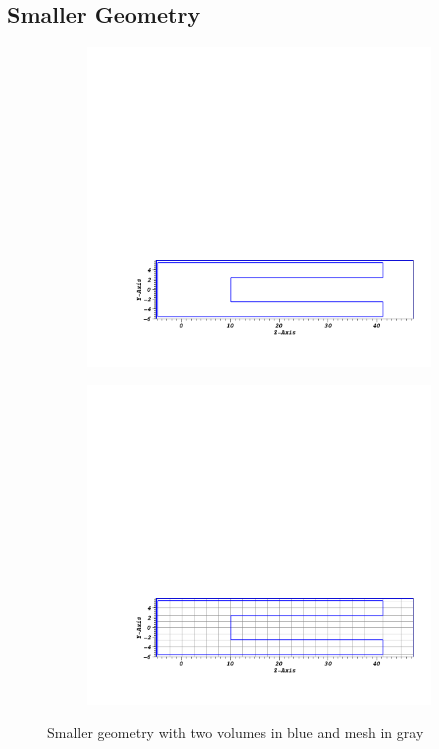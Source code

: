 \subsection{Smaller Geometry}

\begin{figure}[!h]
    \begin{subfigure}{1\textwidth}
        \centering
        \includegraphics[scale=0.4, trim={4cm 3cm 1cm 22cm}, clip]{figs/mesh_geom.png}
        \caption{}
        \label{fig:large_geom1}
    \end{subfigure}
    \begin{subfigure}{1\textwidth}
        \centering
        \includegraphics[scale=0.4, trim={4cm 3cm 1cm 22cm}, clip]{figs/mesh_geom_mesh.png}
        \caption{}
        \label{fig:large_geom2}
    \end{subfigure}
    \caption{Smaller geometry with two volumes in blue and mesh in gray}
    \label{fig:large_geom}
\end{figure}

